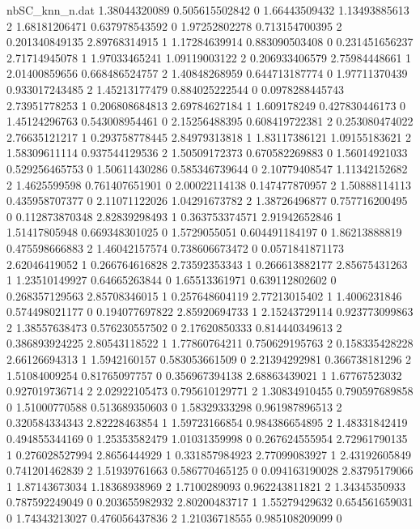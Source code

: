 \begin{filecontents}{nbSC_knn_n.dat}
1.38044320089 0.505615502842 0
1.66443509432 1.13493885613 2
1.68181206471 0.637978543592 0
1.97252802278 0.713154700395 2
0.201340849135 2.89768314915 1
1.17284639914 0.883090503408 0
0.231451656237 2.71714945078 1
1.97033465241 1.09119003122 2
0.206933406579 2.75984448661 1
2.01400859656 0.668486524757 2
1.40848268959 0.644713187774 0
1.97711370439 0.933017243485 2
1.45213177479 0.884025222544 0
0.0978288445743 2.73951778253 1
0.206808684813 2.69784627184 1
1.609178249 0.427830446173 0
1.45124296763 0.543008954461 0
2.15256488395 0.608419722381 2
0.253080474022 2.76635121217 1
0.293758778445 2.84979313818 1
1.83117386121 1.09155183621 2
1.58309611114 0.937544129536 2
1.50509172373 0.670582269883 0
1.56014921033 0.529256465753 0
1.50611430286 0.585346739644 0
2.10779408547 1.11342152682 2
1.4625599598 0.761407651901 0
2.00022114138 0.147477870957 2
1.50888114113 0.435958707377 0
2.11071122026 1.04291673782 2
1.38726496877 0.757716200495 0
0.112873870348 2.82839298493 1
0.363753374571 2.91942652846 1
1.51417805948 0.669348301025 0
1.5729055051 0.604491184197 0
1.86213888819 0.475598666883 2
1.46042157574 0.738606673472 0
0.0571841871173 2.62046419052 1
0.266764616828 2.73592353343 1
0.266613882177 2.85675431263 1
1.23510149927 0.64665263844 0
1.65513361971 0.639112802602 0
0.268357129563 2.85708346015 1
0.257648604119 2.77213015402 1
1.4006231846 0.574498021177 0
0.194077697822 2.85920694733 1
2.15243729114 0.923773099863 2
1.38557638473 0.576230557502 0
2.17620850333 0.814440349613 2
0.386893924225 2.80543118522 1
1.77860764211 0.750629195763 2
0.158335428228 2.66126694313 1
1.5942160157 0.583053661509 0
2.21394292981 0.366738181296 2
1.51084009254 0.81765097757 0
0.356967394138 2.68863439021 1
1.67767523032 0.927019736714 2
2.02922105473 0.795610129771 2
1.30834910455 0.790597689858 0
1.51000770588 0.513689350603 0
1.58329333298 0.961987896513 2
0.320584334343 2.82228463854 1
1.59723166854 0.984386654895 2
1.48331842419 0.494855344169 0
1.25353582479 1.01031359998 0
0.267624555954 2.72961790135 1
0.276028527994 2.8656444929 1
0.331857984923 2.77099083927 1
2.43192605849 0.741201462839 2
1.51939761663 0.586770465125 0
0.094163190028 2.83795179066 1
1.87143673034 1.18368938969 2
1.7100289093 0.962243811821 2
1.34345350933 0.787592249049 0
0.203655982932 2.80200483717 1
1.55279429632 0.654561659031 0
1.74343213027 0.476056437836 2
1.21036718555 0.985108209099 0
\end{filecontents}

